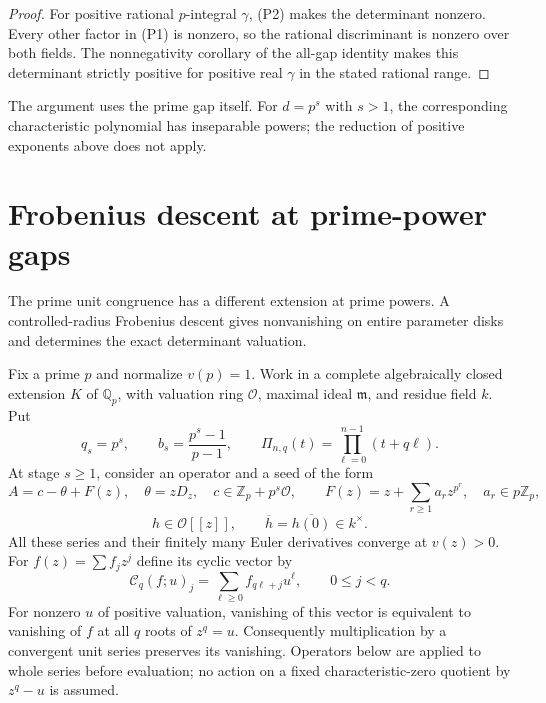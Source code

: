 \documentclass[11pt]{article}
\begin{document}
\begin{proof}
For positive rational $p$-integral $\gamma$, (P2) makes the
determinant nonzero. Every other factor in (P1) is nonzero, so
the rational discriminant is nonzero over both fields.
The nonnegativity corollary of the all-gap identity makes this
determinant strictly positive for positive real $\gamma$ in the
stated rational range.
\end{proof}
The argument uses the prime gap itself. For $d=p^s$ with $s>1$,
the corresponding characteristic polynomial has inseparable
powers; the reduction of positive exponents above does not apply.

\section{Frobenius descent at prime-power gaps}
The prime unit congruence has a different extension at prime powers.
A controlled-radius Frobenius descent gives nonvanishing on entire
parameter disks and determines the exact determinant valuation.

Fix a prime $p$ and normalize $v(p)=1$. Work in a complete
algebraically closed extension $K$ of $\mathbb Q_p$, with valuation
ring $\mathcal O$, maximal ideal $\mathfrak m$, and residue field $k$.
Put
\[
 q_s=p^s,\qquad b_s=\frac{p^s-1}{p-1},\qquad
 \Pi_{n,q}(t)=\prod_{\ell=0}^{n-1}(t+q\ell).
\]
At stage $s\ge1$, consider an operator and a seed of the form
\[
 A=c-\theta+F(z),\quad \theta=zD_z,\quad
 c\in\mathbb Z_p+p^s\mathcal O,\qquad
 F(z)=z+\sum_{r\ge1}a_rz^{p^r},\quad a_r\in p\mathbb Z_p,
\]
\[
 h\in\mathcal O[[z]],\qquad
 \overline h=\overline{h(0)}\in k^\times .
\]
All these series and their finitely many Euler derivatives converge
at $v(z)>0$. For $f(z)=\sum f_jz^j$ define its cyclic vector by
\[
 \mathcal C_q(f;u)_j=\sum_{\ell\ge0}f_{q\ell+j}u^\ell,
       \qquad 0\le j<q.
\]
For nonzero $u$ of positive valuation, vanishing of this vector is
equivalent to vanishing of $f$ at all $q$ roots of $z^q=u$.
Consequently multiplication by a convergent unit series preserves
its vanishing. Operators below are applied to whole series before
evaluation; no action on a fixed characteristic-zero quotient by
$z^q-u$ is assumed.
\end{document}
